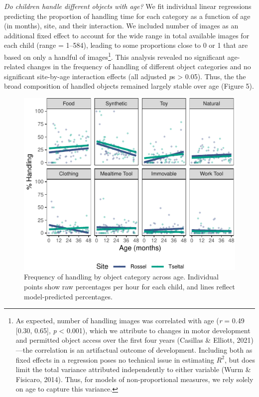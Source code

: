 \documentclass[10pt, letterpaper]{article}
\newenvironment{CodeChunk}{}{}
\begin{document}
\emph{Do children handle different objects with age?} We fit individual
linear regressions predicting the proportion of handling time for each
category as a function of age (in months), site, and their interaction.
We included number of images as an additional fixed effect to account
for the wide range in total available images for each child (range =
1--584), leading to some proportions close to 0 or 1 that are based on
only a handful of images\footnote{As expected, number of handling images
  was correlated with age (\emph{r} = 0.49 {[}0.30, 0.65{]}, \emph{p}
  \textless{} 0.001), which we attribute to changes in motor development
  and permitted object access over the first four years (Casillas \&
  Elliott, 2021)---the correlation is an artifactual outcome of
  development. Including both as fixed effects in a regression poses no
  technical issue in estimating \(R^{2}\), but does limit the total
  variance attributed independently to either variable (Wurm \&
  Fisicaro, 2014). Thus, for models of non-proportional measures, we
  rely solely on age to capture this variance.}. This analysis revealed
no significant age-related changes in the frequency of handling of
different object categories and no significant site-by-age interaction
effects (all adjusted \emph{p}s \textgreater{} 0.05). Thus, the the
broad composition of handled objects remained largely stable over age
(Figure 5).

\begin{CodeChunk}
\begin{figure}[!ht]

{\centering \includegraphics{figs/age-effects-bycategory-fig-1} 

}

\caption[Frequency of handling by object category across age]{Frequency of handling by object category across age. Individual points show raw percentages per hour for each child, and lines reflect model-predicted percentages.}\label{fig:age-effects-bycategory-fig}
\end{figure}
\end{CodeChunk}
\end{document}
